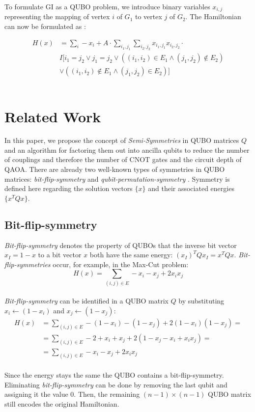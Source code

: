 \documentclass[conference]{IEEEtran}
\theoremstyle{plain}
\theoremstyle{definition}
\theoremstyle{remark}
\begin{document}
To formulate GI as a QUBO problem, we introduce binary variables $x_{i,j}$ representing the mapping of vertex $i$ of $G_1$ to vertex $j$ of $G_2$. The Hamiltonian can now be formulated as \cite{lucas2014ising}:

\begin{equation*}
\begin{aligned}
    H(x) &= \sum_i -x_i + A \cdot \sum_{i_1, j_1} \sum_{i_2, j_2} x_{i_1, j_1} x_{i_2, j_2} \cdot \\ &I[i_1 = j_2 \lor j_1 = j_2 \lor ((i_1, i_2) \in E_1 \land (j_1, j_2) \notin E_2) \\ &\lor ((i_1, i_2) \notin E_1 \land (j_1, j_2) \in E_2)]
\end{aligned}
\end{equation*}
\ \\

\section{Related Work}
In this paper, we propose the concept of \textit{Semi-Symmetries} in QUBO matrices $Q$ and an algorithm for factoring them out into ancilla qubits to reduce the number of couplings and therefore the number of CNOT gates and the circuit depth of QAOA. There are already two well-known types of symmetries in QUBO matrices: \textit{bit-flip-symmetry} and \textit{qubit-permutation-symmetry} \cite{shaydulin2021error, shaydulin2021exploiting, shaydulin2020classical}. Symmetry is defined here regarding the solution vectors $\{x\}$ and their associated energies $\{x^TQx\}$.

\subsection{Bit-flip-symmetry}

\textit{Bit-flip-symmetry} denotes the property of QUBOs that the inverse bit vector $x_I = 1 - x$ to a bit vector $x$ both have the same energy: ${(x_I)}^TQx_I = x^TQx$. \textit{Bit-flip-symmetries} occur, for example, in the Max-Cut problem:
\[
H(x) = \sum_{(i,j) \in E} - x_i - x_j + 2 x_i x_j
\]
\ \\
\textit{Bit-flip-symmetry} can be identified in a QUBO matrix $Q$ by substituting $x_i \gets (1 - x_i)$ and $x_j \gets (1 - x_j)$:
\begin{equation*}
\begin{aligned}
    H(x) &= \sum_{(i,j) \in E} - (1 - x_i) - (1 - x_j) + 2 (1 - x_i) (1 - x_j) = \\ &= \sum_{(i,j) \in E} -2 + x_i + x_j + 2 (1 - x_j - x_i + x_i x_j) = \\ &= \sum_{(i,j) \in E} - x_i - x_j + 2 x_i x_j
\end{aligned}
\end{equation*}
\ \\
Since the energy stays the same the QUBO contains a bit-flip-symmetry. Eliminating \textit{bit-flip-symmetry} can be done by removing the last qubit and assigning it the value $0$. Then, the remaining $(n-1) \times (n-1)$ QUBO matrix still encodes the original Hamiltonian.
\end{document}
